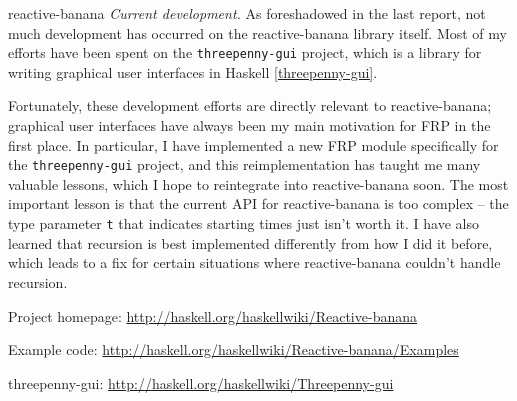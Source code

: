 \begin{hcarentry}[updated]{reactive-banana}
\emph{Current development.}
As foreshadowed in the last report, not much development has occurred on the reactive-banana library itself. Most of my efforts have been spent on the \verb`threepenny-gui` project, which is a library for writing graphical user interfaces in Haskell \cref{threepenny-gui}.

Fortunately, these development efforts are directly relevant to reactive-banana;  graphical user interfaces have always been my main motivation for FRP in the first place. In particular, I have implemented a new FRP module specifically for the \verb`threepenny-gui` project, and this reimplementation has taught me many valuable lessons, which I hope to reintegrate into reactive-banana soon. The most important lesson is that the current API for reactive-banana is too complex -- the type parameter \verb!t! that indicates starting times just isn't worth it. I have also learned that recursion is best implemented differently from how I did it before, which leads to a fix for certain situations where reactive-banana couldn't handle recursion.

\FurtherReading
\begin{compactitem}
\item Project homepage: \url{http://haskell.org/haskellwiki/Reactive-banana}
\item Example code: \url{http://haskell.org/haskellwiki/Reactive-banana/Examples}
\item threepenny-gui: \url{http://haskell.org/haskellwiki/Threepenny-gui}
\end{compactitem}
\end{hcarentry}
